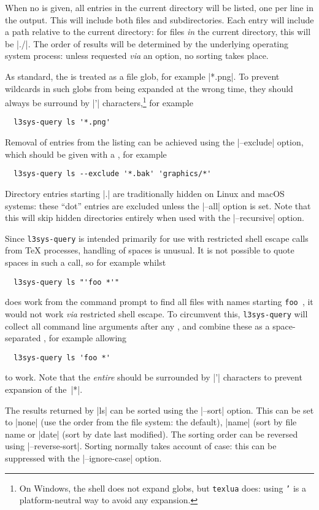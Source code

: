 \documentclass{l3doc}
\begin{document}
\begin{documentation}
When no  is given, all entries in the current directory will be
listed, one per line in the output. This will include both files and
subdirectories. Each entry will include a path relative to the current
directory: for files \emph{in} the current directory, this will be |./|. The
order of results will be determined by the underlying operating system process:
unless requested \emph{via} an option, no sorting takes place.

As standard, the  is treated as a file glob, for example |*.png|. To
prevent wildcards in such globs from being expanded at the wrong time, they
should always be surround by |'| characters,\footnote{On Windows, the shell does
not expand globs, but \texttt{texlua} does: using \texttt{'} is a
platform-neutral way to avoid any expansion.} for example
\begin{verbatim}
  l3sys-query ls '*.png'
\end{verbatim}
Removal of entries from the listing can be achieved using the |--exclude| option,
which should be given with a , for example
\begin{verbatim}
  l3sys-query ls --exclude '*.bak' 'graphics/*'
\end{verbatim}
Directory entries starting |.| are traditionally hidden on Linux and macOS
systems: these \enquote{dot} entries are excluded unless the |--all| option is
set. Note that this will skip hidden directories entirely when used with the
|--recursive| option.

Since \texttt{l3sys-query} is intended primarily for use with restricted shell
escape calls from \TeX{} processes, handling of spaces is unusual. It is not
possible to quote spaces in such a call, so for example whilst
\begin{verbatim}
  l3sys-query ls "'foo *'"
\end{verbatim}
does work from the command prompt to find all files with names starting
\verb*|foo |, it would not work \emph{via} restricted shell escape. To
circumvent this, \texttt{l3sys-query} will collect all command line arguments
after any , and combine these as a space-separated ,
for example allowing
\begin{verbatim}
  l3sys-query ls 'foo *'
\end{verbatim}
to work. Note that the \emph{entire}  should be surrounded by |'|
characters to prevent expansion of the~|*|.

The results returned by |ls| can be sorted using the |--sort| option. This
can be set to |none| (use the order from the file system: the default),
|name| (sort by file name or |date| (sort by date last modified). The sorting
order can be reversed using |--reverse-sort|. Sorting normally takes account
of case: this can be suppressed with the |--ignore-case| option.


\end{documentation}
\end{document}
